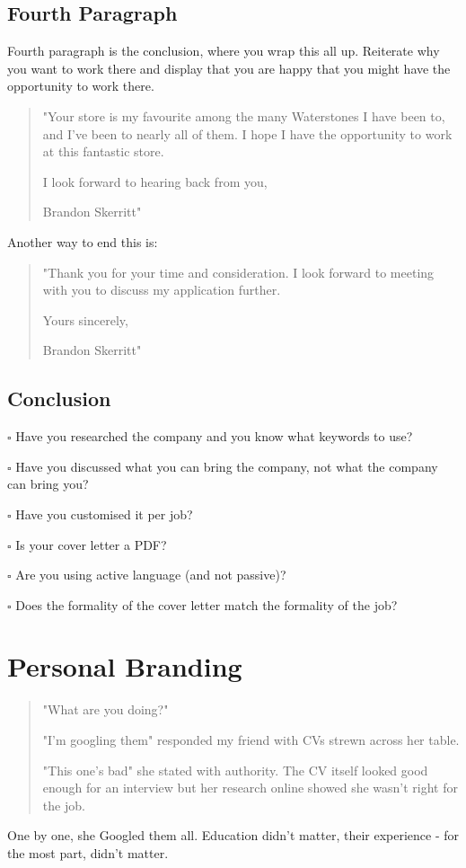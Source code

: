 \documentclass{article}
\begin{document}
\subsection{Fourth Paragraph}
Fourth paragraph is the conclusion, where you wrap this all up.
Reiterate why you want to work there and display that you are happy that
you might have the opportunity to work there.

\begin{quote}"Your store is my favourite among the many Waterstones I have been to, and I've been to nearly all of them. I hope I have the opportunity to work at this fantastic store.

I look forward to hearing back from you,

Brandon Skerritt"\end{quote}

Another way to end this is:

\begin{quote}"Thank you for your time and consideration. I look forward to meeting with you to discuss my application further.

Yours sincerely,

Brandon Skerritt"\end{quote}
\subsection{Conclusion}
$\square$ Have you researched the company and you know what keywords to use?

$\square$ Have you discussed what you can bring the company, not what the
company can bring you?

$\square$ Have you customised it per job?

$\square$ Is your cover letter a PDF?

$\square$ Are you using active language (and not passive)?

$\square$ Does the formality of the cover letter match the formality of the job?
\newpage
\section{Personal Branding}
\begin{quote}"What are you doing?"

"I'm googling them" responded my friend with CVs strewn across her
table.

"This one's bad" she stated with authority. The CV itself looked good
enough for an interview but her research online showed she wasn't right
for the job.\end{quote}
One by one, she Googled them all. Education didn't matter, their
experience - for the most part, didn't matter.
\end{document}

